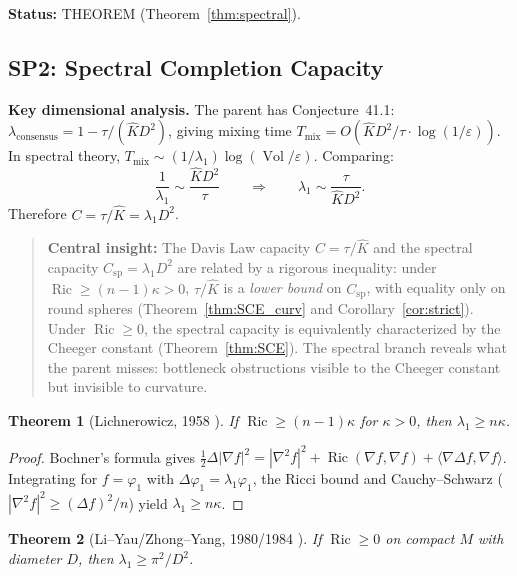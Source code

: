 \documentclass[11pt]{article}
\newtheorem{theorem}{Theorem}[section]
\theoremstyle{definition}
\theoremstyle{remark}
\newcommand{\Ric}{\operatorname{Ric}}
\newcommand{\Vol}{\operatorname{Vol}}
\newcommand{\Csp}{C_{\mathrm{sp}}}
\begin{document}
\textbf{Status:} THEOREM (Theorem~\ref{thm:spectral}).


\subsection{SP2: Spectral Completion Capacity}

\textbf{Key dimensional analysis.} The parent has Conjecture~41.1: $\lambda_{\mathrm{consensus}} = 1 - \tau/(\hat{K} D^2)$, giving mixing time $T_{\mathrm{mix}} = O(\hat{K} D^2/\tau \cdot \log(1/\varepsilon))$. In spectral theory, $T_{\mathrm{mix}} \sim (1/\lambda_1)\log(\Vol/\varepsilon)$. Comparing:
\[
\frac{1}{\lambda_1} \sim \frac{\hat{K} D^2}{\tau} \qquad\Longrightarrow\qquad \lambda_1 \sim \frac{\tau}{\hat{K} D^2}.
\]
Therefore $C = \tau/\hat{K} = \lambda_1 D^2$.

\begin{quote}
\textbf{Central insight:} The Davis Law capacity $C = \tau/\hat{K}$ and the spectral capacity $\Csp = \lambda_1 D^2$ are related by a rigorous inequality: under $\Ric \ge (n-1)\kappa > 0$, $\tau/\hat{K}$ is a \emph{lower bound} on $\Csp$, with equality only on round spheres (Theorem~\ref{thm:SCE_curv} and Corollary~\ref{cor:strict}). Under $\Ric \ge 0$, the spectral capacity is equivalently characterized by the Cheeger constant (Theorem~\ref{thm:SCE}). The spectral branch reveals what the parent misses: bottleneck obstructions visible to the Cheeger constant but invisible to curvature.
\end{quote}

\begin{theorem}[Lichnerowicz, 1958 {\cite{Lichnerowicz}}]\label{thm:lich}
If $\Ric \ge (n-1)\kappa$ for $\kappa > 0$, then $\lambda_1 \ge n\kappa$.
\end{theorem}

\begin{proof}
Bochner's formula gives $\frac{1}{2}\Delta|\nabla f|^2 = |\nabla^2 f|^2 + \Ric(\nabla f, \nabla f) + \langle\nabla\Delta f, \nabla f\rangle$. Integrating for $f = \varphi_1$ with $\Delta\varphi_1 = \lambda_1\varphi_1$, the Ricci bound and Cauchy--Schwarz ($|\nabla^2 f|^2 \ge (\Delta f)^2/n$) yield $\lambda_1 \ge n\kappa$.
\end{proof}

\begin{theorem}[Li--Yau/Zhong--Yang, 1980/1984 {\cite{LiYau}}]\label{thm:liyau}
If $\Ric \ge 0$ on compact $M$ with diameter $D$, then $\lambda_1 \ge \pi^2/D^2$.
\end{theorem}
\end{document}
